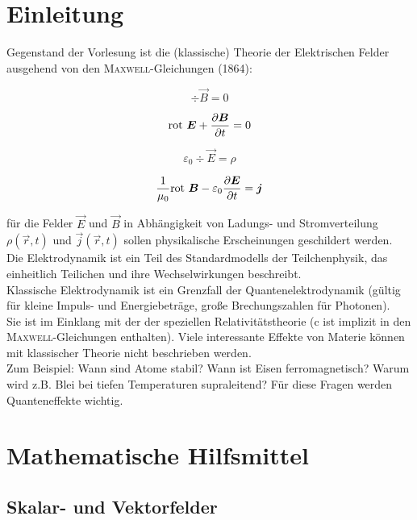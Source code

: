 \chapter{Einleitung}
Gegenstand der Vorlesung ist die (klassische) Theorie der Elektrischen Felder ausgehend von den \textsc{Maxwell}-Gleichungen (1864):

\begin{equation*}
\div \vec{B}=0
\end{equation*}

\begin{equation*}
\text{rot }  \bm{E}+\frac{\partial{\bm{B}}}{\partial{t}}=0
\end{equation*}

\begin{equation*}
\varepsilon_0\div \vec{E}=\rho
\end{equation*}

\begin{equation*}
\frac{1}{\mu_0}\text{rot } \bm{B}-\varepsilon_0\frac{\partial{\bm{E}}}{\partial{t}}=\bm{j}
\end{equation*}

für die Felder $\vec{E}$ und $\vec{B}$ in Abhängigkeit von Ladungs- und Stromverteilung $\rho(\vec{r},t)$ und $\vec{j}(\vec{r},t)$  sollen physikalische Erscheinungen geschildert werden.\\
Die Elektrodynamik ist ein Teil des Standardmodells der Teilchenphysik, das einheitlich Teilichen und ihre Wechselwirkungen beschreibt.\\
Klassische Elektrodynamik ist ein Grenzfall der Quantenelektrodynamik (gültig für kleine Impuls- und Energiebeträge, große Brechungszahlen für Photonen).\\
Sie ist im Einklang mit der der speziellen Relativitätstheorie (c ist implizit in den \textsc{Maxwell}-Gleichungen enthalten). Viele interessante Effekte von Materie können mit klassischer Theorie nicht beschrieben werden.\\
Zum Beispiel: Wann sind Atome stabil? Wann ist Eisen ferromagnetisch? Warum wird z.B. Blei bei tiefen Temperaturen supraleitend? Für diese Fragen werden Quanteneffekte wichtig.

\chapter{Mathematische Hilfsmittel}

\section{Skalar- und Vektorfelder}

